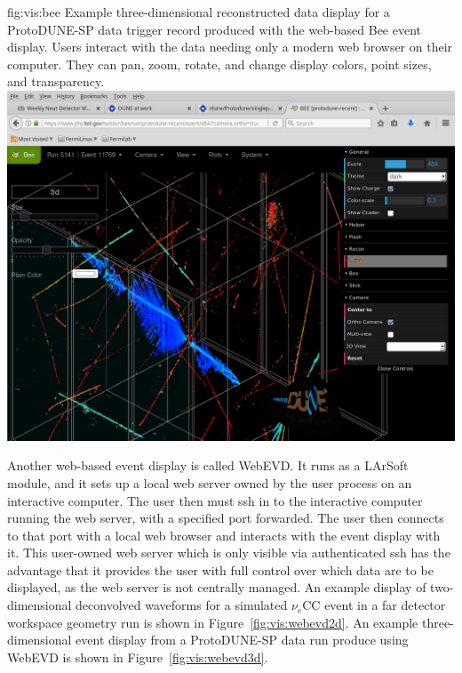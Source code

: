 \documentclass[../main-v1.tex]{subfiles}
\begin{document}
\begin{dunefigure}
{fig:vis:bee} 
{Example three-dimensional reconstructed data display for a ProtoDUNE-SP data trigger record produced with the web-based Bee event display.  Users interact with the data needing only a modern web browser on their computer.  They can pan, zoom, rotate, and change display colors, point sizes, and transparency.}
\includegraphics[width=0.9 \textwidth]{graphics/EventDisplays/bee_pdsp_evd1.png}
\end{dunefigure}

Another web-based event display is called WebEVD.  It runs as a LArSoft module, and it sets up a local web server owned by the user process on an interactive computer.  The user then must ssh in to the interactive computer running the web server, with a specified port forwarded.  The user then connects to that port with a local web browser and interacts with the event display with it.  This user-owned web server which is only visible via authenticated ssh has the advantage that it provides the user with full control over which data are to be displayed, as the web server is not centrally managed.  An example display of two-dimensional deconvolved waveforms for a simulated $\nu_e$CC event in a far detector workspace geometry run is shown in Figure~\ref{fig:vis:webevd2d}.  An example three-dimensional event display from a ProtoDUNE-SP data run produce using WebEVD is shown in Figure~\ref{fig:vis:webevd3d}.
\end{document}
